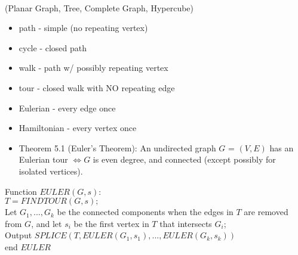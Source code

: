 \documentclass{article}
\begin{document}
 \\
(Planar Graph, Tree, Complete Graph, Hypercube)
\begin{itemize}
\item path - simple (no repeating vertex)
\item cycle - closed path
\item walk - path w/ possibly repeating vertex
\item tour - closed walk with NO repeating edge
\item Eulerian - every edge once
\item Hamiltonian - every vertex once
\item Theorem 5.1 (Euler’s Theorem): An undirected graph $G$ = $(V,E)$ has an Eulerian tour $\iff G$ is even degree, and connected (except possibly for isolated vertices).
\end{itemize}
Function $EULER(G,s)$: \\
\indent $T = FINDTOUR(G,s);$ \\
\indent Let $G_1,...,G_k$ be the connected components when the edges in $T$ are removed from $G$, and let $s_i$ be the first vertex in $T$ that intersects $G_i$; \\
\indent Output $SPLICE(T,EULER(G_1,s_1),...,EULER(G_k,s_k))$ \\
end $EULER$
\end{document}
